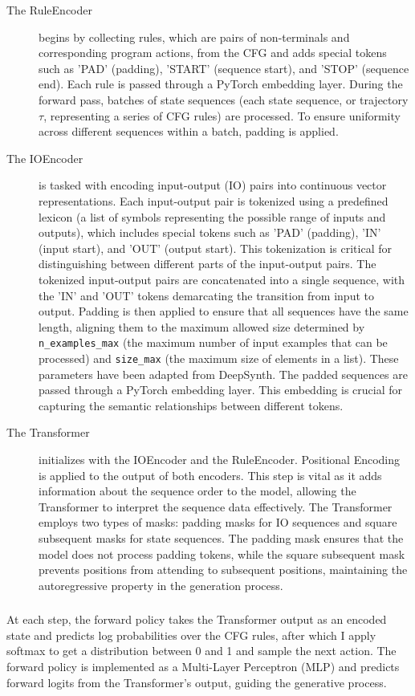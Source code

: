 \begin{description}
    \item[The RuleEncoder] begins by collecting rules, which are pairs of non-terminals and corresponding program actions, from the CFG and adds special tokens such as 'PAD' (padding), 'START' (sequence start), and 'STOP' (sequence end). Each rule is passed through a PyTorch embedding layer.
    During the forward pass, batches of state sequences (each state sequence, or trajectory $\tau$, representing a series of CFG rules) are processed. To ensure uniformity across different sequences within a batch, padding is applied.
    \item[The IOEncoder] is tasked with encoding input-output (IO) pairs into continuous vector representations.
    Each input-output pair is tokenized using a predefined lexicon (a list of symbols representing the possible range of inputs and outputs), which includes special tokens such as 'PAD' (padding), 'IN' (input start), and 'OUT' (output start). This tokenization is critical for distinguishing between different parts of the input-output pairs.
    The tokenized input-output pairs are concatenated into a single sequence, with the 'IN' and 'OUT' tokens demarcating the transition from input to output. Padding is then applied to ensure that all sequences have the same length, aligning them to the maximum allowed size determined by \texttt{n\_examples\_max} (the maximum number of input examples that can be processed) and \texttt{size\_max} (the maximum size of elements in a list). These parameters have been adapted from DeepSynth. The padded sequences are passed through a PyTorch embedding layer. This embedding is crucial for capturing the semantic relationships between different tokens.
    \item[The Transformer] initializes with the IOEncoder and the RuleEncoder. Positional Encoding is applied to the output of both encoders. This step is vital as it adds information about the sequence order to the model, allowing the Transformer to interpret the sequence data effectively.
    The Transformer employs two types of masks: padding masks for IO sequences and square subsequent masks for state sequences. The padding mask ensures that the model does not process padding tokens, while the square subsequent mask prevents positions from attending to subsequent positions, maintaining the autoregressive property in the generation process.
\end{description}

\subsubsection{}
At each step, the forward policy takes the Transformer output as an encoded state and predicts log probabilities over the CFG rules, after which I apply softmax to get a distribution between 0 and 1 and sample the next action. 
The forward policy is implemented as a Multi-Layer Perceptron (MLP) and predicts forward logits from the Transformer's output, guiding the generative process.

